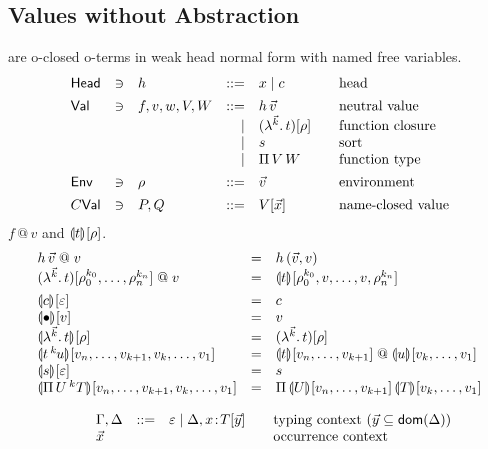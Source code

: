\documentclass[a4paper]{article}
\makeatletter
\newcommand{\oann}[1]{{}^{#1}\kern-0.15ex}
\newcommand{\ovar}{\mathord{\bullet}}
\newcommand{\oapp}[1]{\,\oann{#1}}
\newcommand{\olam}[1]{\lambda^{#1}.\,}
\newcommand{\opi}[2]{\Pi\,#1\,^{#2}}
\renewcommand{\esubst}[2]{#1[#2]}
\renewcommand{\cempty}{\varepsilon}
\renewcommand{\sempty}{\varepsilon}
\newcommand{\oclos}[2]{#1[#2]}
\newcommand{\Head}{\mathsf{Head}}
\newcommand{\appa}{\mathrel{@}}
\renewcommand{\eval}[2]{\dent{#1}{}[#2]}
\makeatother
\begin{document}
\subsection{Values without Abstraction}

 are o-closed o-terms in weak head normal form with named
free variables.
\[
\begin{array}{lllrl@{\qquad}l}
\Head & \ni & h & ::= &  x \mid c & \mbox{head} \\[1ex]
\Val & \ni & f,v,w,V,W & ::= & h \, {\vec v} & \mbox{neutral
  value} \\
&&& \mid & \esubst{(\olam {\vec k} t)}{\rho} & \mbox{function closure} \\
&&& \mid & s & \mbox{sort} \\
&&& \mid & \piT V  W & \mbox{function type} \\[1ex]
\Env & \ni & \rho & ::= & \vec v & \mbox{environment} \\[1ex]
C\Val& \ni & P,Q & ::= & \esubst V {\vec x} & \mbox{name-closed value} \\
\end{array}
\]
 $f \appa v$ and $\eval t \rho$.
\[
\begin{array}{lll}
  h \,{\vec v} \appa v 
    & = & h \, {(\vec v,v)} \\
  \esubst{(\olam {\vec k} t)}{\rho_0^{k_0},\dots,\rho_n^{k_n}} \appa v
    & = & \eval t
    {\rho_0^{k_0},v,\dots,v,\rho_n^{k_n}}
\\[1ex]
  \eval c {\sempty} & = & c \\
  \eval \ovar {v} & = & v \\
  \eval {\olam{\vec k}t} \rho & = & \esubst {(\olam{\vec k}t)} \rho
  \\
  \eval {t \oapp k u} {v_n,\dots,v_{k+1},
                       v_k,\dots,v_1} 
    & = & \eval t {v_n,\dots,v_{k+1}} \appa \eval u {v_k,\dots,v_1}
\\ 
  \eval s \sempty & = & s \\
  \eval {\opi U k T} {v_n,\dots,v_{k+1},
                      v_k,\dots,v_1} 
    & = & \piT {\eval U {v_n,\dots,v_{k+1}}} {\eval T {v_k,\dots,v_1}}
\\ 
\end{array}
\]

\[
\begin{array}{lllrl@{\qquad}l}
&& \Gamma,\Delta & ::= & \cempty \mid \Delta, x \of \oclos{T}{\vec y} 
  & \mbox{typing context } (\vec y \subseteq \dom(\Delta)) 
\\
&& \vec x &&& \mbox{occurrence context} \\
\end{array}
\]
\end{document}
